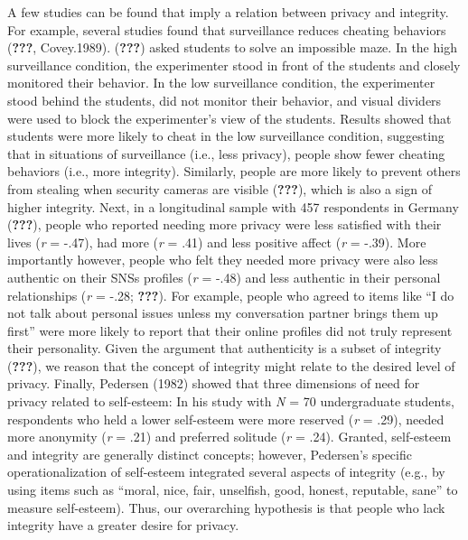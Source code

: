 \documentclass[man]{apa6}
\theoremstyle{definition}
\theoremstyle{definition}
\theoremstyle{definition}
\theoremstyle{remark}
\begin{document}
A few studies can be found that imply a relation between privacy and
integrity. For example, several studies found that surveillance reduces
cheating behaviors ({\textbf{???}}, Covey.1989). ({\textbf{???}}) asked
students to solve an impossible maze. In the high surveillance
condition, the experimenter stood in front of the students and closely
monitored their behavior. In the low surveillance condition, the
experimenter stood behind the students, did not monitor their behavior,
and visual dividers were used to block the experimenter's view of the
students. Results showed that students were more likely to cheat in the
low surveillance condition, suggesting that in situations of
surveillance (i.e., less privacy), people show fewer cheating behaviors
(i.e., more integrity). Similarly, people are more likely to prevent
others from stealing when security cameras are visible ({\textbf{???}}),
which is also a sign of higher integrity. Next, in a longitudinal sample
with 457 respondents in Germany ({\textbf{???}}), people who reported
needing more privacy were less satisfied with their lives (\emph{r} =
-.47), had more (\emph{r} = .41) and less positive affect (\emph{r} =
-.39). More importantly however, people who felt they needed more
privacy were also less authentic on their SNSs profiles (\emph{r} =
-.48) and less authentic in their personal relationships (\emph{r} =
-.28; {\textbf{???}}). For example, people who agreed to items like
\enquote{I do not talk about personal issues unless my conversation
partner brings them up first} were more likely to report that their
online profiles did not truly represent their personality. Given the
argument that authenticity is a subset of integrity ({\textbf{???}}), we
reason that the concept of integrity might relate to the desired level
of privacy. Finally, Pedersen (1982) showed that three dimensions of
need for privacy related to self-esteem: In his study with \emph{N} = 70
undergraduate students, respondents who held a lower self-esteem were
more reserved (\emph{r} = .29), needed more anonymity (\emph{r} = .21)
and preferred solitude (\emph{r} = .24). Granted, self-esteem and
integrity are generally distinct concepts; however, Pedersen's specific
operationalization of self-esteem integrated several aspects of
integrity (e.g., by using items such as \enquote{moral, nice, fair,
unselfish, good, honest, reputable, sane} to measure self-esteem). Thus,
our overarching hypothesis is that people who lack integrity have a
greater desire for privacy.
\end{document}
